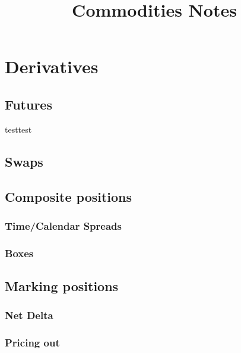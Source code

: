 \documentclass{article}
\title{Commodities Notes}
\date{}
\begin{document}
\maketitle
\tableofcontents


\section{Derivatives}
\subsection{Futures}
testtest
\subsection{Swaps}


\subsection{Composite positions}

\subsubsection{Time/Calendar Spreads}
\subsubsection{Boxes}


\subsection{Marking positions}

\subsubsection{Net Delta}
\subsubsection{Pricing out}
\end{document}
